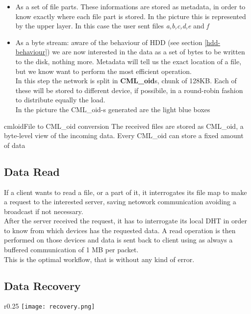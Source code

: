 \begin{itemize}
    \item As a set of file parts. These informations are stored as metadata, in
        order to know exactly where each file part is stored. In the picture
        this is represented by the upper layer. In this case the user sent files
        \textit{a,b,c,d,e} and \textit{f}
    \item As a byte stream: aware of the behaviour of HDD (see section
        \ref{hdd-behaviour}) we are now interested in the data as a set of bytes
        to be written to the disk, nothing more. Metadata will tell us the exact
        location of a file, but we know want to perform the most efficient
        operation. \\
        In this step the network is split in \textbf{CML\_oid}s, chunk of 128KB.
        Each of these will be stored to different device, if possibile, in a
        round-robin fashion to distribute equally the load. \\
        In the picture the CML\_oid-s generated are the light blue boxes
\end{itemize}

\begin{myimage}{cmloid}{File to CML\_oid conversion}
    The received files are stored as CML\_oid, a byte-level view of the incoming
    data. Every CML\_oid can store a fixed amount of data
\end{myimage}

\subsection{Data Read}
If a client wants to read a file, or a part of it, it interrogates its file map
to make a request to the interested server, saving netowork communication
avoiding a broadcast if not necessary. \\
After the server received the request, it has to interrogate its local DHT in
order to know from which devices has the requested data. A read operation is
then performed on those devices and data is sent back to client using as always
a buffered communication of 1 MB per packet. \\
This is the optimal workflow, that is without any kind of error.

\subsection{Data Recovery}
\begin{wrapfigure}{r}{0.25\textwidth}
    \centering
    \texttt{[image: recovery.png]}
\end{wrapfigure}

